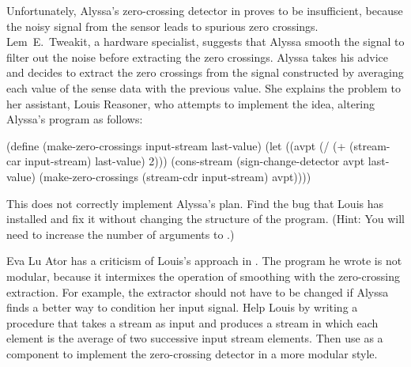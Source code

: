 \begin{exercise}
	\label{Exercise 3.75}
	Unfortunately, Alyssa’s zero-crossing detector in  proves to be insufficient, because the noisy signal from the sensor leads to spurious zero crossings.
	Lem~E.~Tweakit, a hardware specialist, suggests that Alyssa smooth the signal to filter out the noise before extracting the zero crossings.
	Alyssa takes his advice and decides to extract the zero crossings from the signal constructed by averaging each value of the sense data with the previous value.
	She explains the problem to her assistant, Louis Reasoner, who attempts to implement the idea, altering Alyssa’s program as follows:
	\begin{scheme}
	  (define (make-zero-crossings input-stream last-value)
	    (let ((avpt (/ (+ (stream-car input-stream)
	                      last-value)
	                   2)))
	      (cons-stream
	       (sign-change-detector avpt last-value)
	       (make-zero-crossings
	        (stream-cdr input-stream) avpt))))
	\end{scheme}
	This does not correctly implement Alyssa’s plan.
	Find the bug that Louis has installed and fix it without changing the structure of the program.
	(Hint:
	You will need to increase the number of arguments to .)
\end{exercise}



\begin{exercise}
	\label{Exercise 3.76}
	Eva Lu Ator has a criticism of Louis’s approach in .
	The program he wrote is not modular, because it intermixes the operation of smoothing with the zero-crossing extraction.
	For example, the extractor should not have to be changed if Alyssa finds a better way to condition her input signal.
	Help Louis by writing a procedure  that takes a stream as input and produces a stream in which each element is the average of two successive input stream elements.
	Then use  as a component to implement the zero-crossing detector in a more modular style.
\end{exercise}
